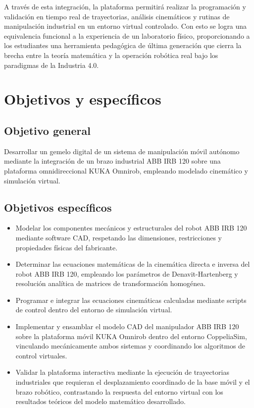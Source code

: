 \documentclass[11pt,oneside]{report}
\begin{document}
A través de esta integración, la plataforma permitirá realizar la programación y validación en tiempo real de trayectorias, análisis cinemáticos y rutinas de manipulación industrial en un entorno virtual controlado. Con esto se logra una equivalencia funcional a la experiencia de un laboratorio físico, proporcionando a los estudiantes una herramienta pedagógica de última generación que cierra la brecha entre la teoría matemática y la operación robótica real bajo los paradigmas de la Industria 4.0.

\chapter{Objetivos y específicos}

\section{Objetivo general}

Desarrollar un gemelo digital de un sistema de manipulación móvil autónomo mediante la integración de un brazo industrial ABB IRB 120 sobre una plataforma omnidireccional KUKA Omnirob, empleando modelado cinemático y simulación virtual.

\section{Objetivos específicos}

\begin{itemize}
  \item Modelar los componentes mecánicos y estructurales del robot ABB IRB 120 mediante software CAD, respetando las dimensiones, restricciones y propiedades físicas del fabricante.
  \item Determinar las ecuaciones matemáticas de la cinemática directa e inversa del robot ABB IRB 120, empleando los parámetros de Denavit-Hartenberg y resolución analítica de matrices de transformación homogénea.
  \item Programar e integrar las ecuaciones cinemáticas calculadas mediante scripts de control dentro del entorno de simulación virtual.
  \item Implementar y ensamblar el modelo CAD del manipulador ABB IRB 120 sobre la plataforma móvil KUKA Omnirob dentro del entorno CoppeliaSim, vinculando mecánicamente ambos sistemas y coordinando los algoritmos de control virtuales.
  \item Validar la plataforma interactiva mediante la ejecución de trayectorias industriales que requieran el desplazamiento coordinado de la base móvil y el brazo robótico, contrastando la respuesta del entorno virtual con los resultados teóricos del modelo matemático desarrollado.
\end{itemize}
\end{document}
